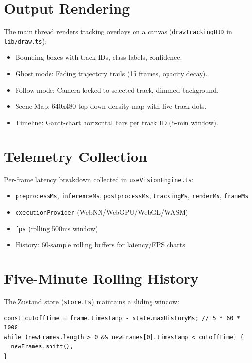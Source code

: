 \section{Output Rendering}
\label{sec:rendering}

The main thread renders tracking overlays on a canvas (\texttt{drawTrackingHUD} in \texttt{lib/draw.ts}):

\begin{itemize}
    \item Bounding boxes with track IDs, class labels, confidence.
    \item Ghost mode: Fading trajectory trails (15 frames, opacity decay).
    \item Follow mode: Camera locked to selected track, dimmed background.
    \item Scene Map: 640x480 top-down density map with live track dots.
    \item Timeline: Gantt-chart horizontal bars per track ID (5-min window).
\end{itemize}

\section{Telemetry Collection}
\label{sec:telemetry}

Per-frame latency breakdown collected in \texttt{useVisionEngine.ts}:

\begin{itemize}
    \item \texttt{preprocessMs}, \texttt{inferenceMs}, \texttt{postprocessMs}, \texttt{trackingMs}, \texttt{renderMs}, \texttt{frameMs}
    \item \texttt{executionProvider} (WebNN/WebGPU/WebGL/WASM)
    \item \texttt{fps} (rolling 500ms window)
    \item History: 60-sample rolling buffers for latency/FPS charts
\end{itemize}

\section{Five-Minute Rolling History}
\label{sec:history}

The Zustand store (\texttt{store.ts}) maintains a sliding window:

\begin{lstlisting}[style=typescript, caption={History pruning in store.ts}]
const cutoffTime = frame.timestamp - state.maxHistoryMs; // 5 * 60 * 1000
while (newFrames.length > 0 && newFrames[0].timestamp < cutoffTime) {
  newFrames.shift();
}
\end{lstlisting}


